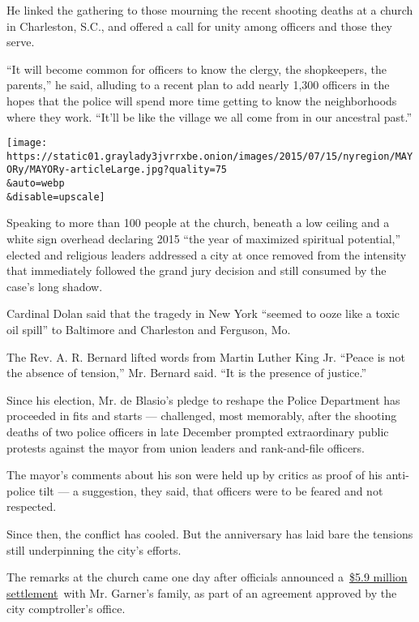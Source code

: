 He linked the gathering to those mourning the recent shooting deaths at
a church in Charleston, S.C., and offered a call for unity among
officers and those they serve.

``It will become common for officers to know the clergy, the
shopkeepers, the parents,'' he said, alluding to a recent plan to add
nearly 1,300 officers in the hopes that the police will spend more time
getting to know the neighborhoods where they work. ``It'll be like the
village we all come from in our ancestral past.''

\texttt{[image: https://static01.graylady3jvrrxbe.onion/images/2015/07/15/nyregion/MAYORy/MAYORy-articleLarge.jpg?quality=75\\\&auto=webp\\\&disable=upscale]}

Speaking to more than 100 people at the church, beneath a low ceiling
and a white sign overhead declaring 2015 ``the year of maximized
spiritual potential,'' elected and religious leaders addressed a city at
once removed from the intensity that immediately followed the grand jury
decision and still consumed by the case's long shadow.

Cardinal Dolan said that the tragedy in New York ``seemed to ooze like a
toxic oil spill'' to Baltimore and Charleston and Ferguson, Mo.

The Rev. A. R. Bernard lifted words from Martin Luther King Jr. ``Peace
is not the absence of tension,'' Mr. Bernard said. ``It is the presence
of justice.''

Since his election, Mr. de Blasio's pledge to reshape the Police
Department has proceeded in fits and starts --- challenged, most
memorably, after the shooting deaths of two police officers in late
December prompted extraordinary public protests against the mayor from
union leaders and rank-and-file officers.

The mayor's comments about his son were held up by critics as proof of
his anti-police tilt --- a suggestion, they said, that officers were to
be feared and not respected.

Since then, the conflict has cooled. But the anniversary has laid bare
the tensions still underpinning the city's efforts.

The remarks at the church came one day after officials announced
a~\href{http://www.nytimes3xbfgragh.onion/2015/07/14/nyregion/eric-garner-case-is-settled-by-new-york-city-for-5-9-million.html}{\$5.9
million settlement}~with Mr. Garner's family, as part of an agreement
approved by the city comptroller's office.

